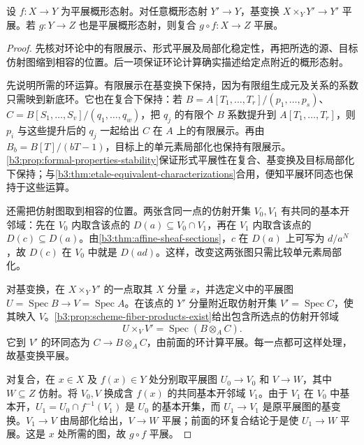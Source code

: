 \begin{proposition}\label{b3:prop:etale-scheme-stability}
	设 \(f:X\rightarrow Y\) 为平展概形态射。对任意概形态射 \(Y'\rightarrow Y\)，基变换 \(X\times_YY'\rightarrow Y'\) 平展。若 \(g:Y\rightarrow Z\) 也是平展概形态射，则复合 \(g\circ f:X\rightarrow Z\) 平展。
\end{proposition}
\begin{proof}
	先核对环论中的有限展示、形式平展及局部化稳定性，再把所选的源、目标仿射图缩到相容的位置。后一项保证环论计算确实描述给定点附近的概形态射。

	先说明所需的环运算。有限展示在基变换下保持，因为有限组生成元及关系的系数只需映到新底环。它也在复合下保持：若 \(B=A[T_1,\ldots,T_r]/(p_1,\ldots,p_s)\)、\(C=B[S_1,\ldots,S_v]/(q_1,\ldots,q_w)\)，把 \(q_j\) 的有限个 \(B\) 系数提升到 \(A[T_1,\ldots,T_r]\)，则 \(p_i\) 与这些提升后的 \(q_j\) 一起给出 \(C\) 在 \(A\) 上的有限展示。再由 \(B_b=B[T]/(bT-1)\)，目标上的单元素局部化也保持有限展示。\cref{b3:prop:formal-properties-stability}保证形式平展性在复合、基变换及目标局部化下保持；与\cref{b3:thm:etale-equivalent-characterizations}合用，便知平展环同态也保持于这些运算。

	还需把仿射图取到相容的位置。两张含同一点的仿射开集 \(V_0,V_1\) 有共同的基本开邻域：先在 \(V_0\) 内取含该点的 \(D(a)\subseteq V_0\cap V_1\)，再在 \(V_1\) 内取含该点的 \(D(c)\subseteq D(a)\)。由\cref{b3:thm:affine-sheaf-sections}，\(c\) 在 \(D(a)\) 上可写为 \(d/a^N\)，故 \(D(c)\) 在 \(V_0\) 中就是 \(D(ad)\)。这样，改变这两张图只需比较单元素局部化。

	对基变换，在 \(X\times_YY'\) 的一点取其 \(X\) 分量 \(x\)，并选定义中的平展图 \(U=\operatorname{Spec}B\rightarrow V=\operatorname{Spec}A\)。在该点的 \(Y'\) 分量附近取仿射开集 \(V'=\operatorname{Spec}C\)，使其映入 \(V\)。\cref{b3:prop:scheme-fiber-products-exist}给出包含所选点的仿射开邻域
	\[
		U\times_VV'=\operatorname{Spec}(B\otimes_AC).
	\]
	它到 \(V'\) 的环同态为 \(C\rightarrow B\otimes_AC\)，由前面的环计算平展。每一点都可这样处理，故基变换平展。

	对复合，在 \(x\in X\) 及 \(f(x)\in Y\) 处分别取平展图 \(U_0\rightarrow V_0\) 和 \(V\rightarrow W\)，其中 \(W\subseteq Z\) 仿射。将 \(V_0,V\) 换成含 \(f(x)\) 的共同基本开邻域 \(V_1\)。由于 \(V_1\) 在 \(V_0\) 中基本开，\(U_1=U_0\cap f^{-1}(V_1)\) 是 \(U_0\) 的基本开集，而 \(U_1\rightarrow V_1\) 是原平展图的基变换。\(V_1\rightarrow V\) 由局部化给出，\(V\rightarrow W\) 平展；前面的环复合结论于是使 \(U_1\rightarrow W\) 平展。这是 \(x\) 处所需的图，故 \(g\circ f\) 平展。
\end{proof}

